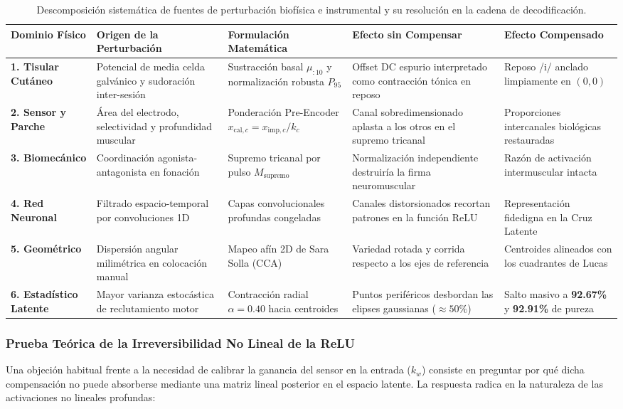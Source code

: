 \documentclass[11pt,a4paper,openany]{book}
\theoremstyle{definition}
\begin{document}
\begin{table}[H]
\centering
\small
\begin{tabularx}{\textwidth}{p{2.2cm}p{3.2cm}p{3.0cm}p{3.8cm}p{2.6cm}}
\toprule
\textbf{Dominio Físico} & \textbf{Origen de la Perturbación} & \textbf{Formulación Matemática} & \textbf{Efecto sin Compensar} & \textbf{Efecto Compensado} \\
\midrule
\textbf{1. Tisular Cutáneo} & Potencial de media celda galvánico y sudoración inter-sesión & Sustracción basal $\mu_{:10}$ y normalización robusta $P_{95}$ & Offset DC espurio interpretado como contracción tónica en reposo & Reposo /i/ anclado limpiamente en $(0,0)$ \\
\midrule
\textbf{2. Sensor y Parche} & Área del electrodo, selectividad y profundidad muscular & Ponderación Pre-Encoder $x_{\text{cal}, c} = x_{\text{imp}, c} / k_c$ & Canal sobredimensionado aplasta a los otros en el supremo tricanal & Proporciones intercanales biológicas restauradas \\
\midrule
\textbf{3. Biomecánico} & Coordinación agonista-antagonista en fonación & Supremo tricanal por pulso $M_{\text{supremo}}$ & Normalización independiente destruiría la firma neuromuscular & Razón de activación intermuscular intacta \\
\midrule
\textbf{4. Red Neuronal} & Filtrado espacio-temporal por convoluciones 1D & Capas convolucionales profundas congeladas & Canales distorsionados recortan patrones en la función $\text{ReLU}$ & Representación fidedigna en la Cruz Latente \\
\midrule
\textbf{5. Geométrico} & Dispersión angular milimétrica en colocación manual & Mapeo afín 2D de Sara Solla (CCA) & Variedad rotada y corrida respecto a los ejes de referencia & Centroides alineados con los cuadrantes de Lucas \\
\midrule
\textbf{6. Estadístico Latente} & Mayor varianza estocástica de reclutamiento motor & Contracción radial $\alpha = 0.40$ hacia centroides & Puntos periféricos desbordan las elipses gaussianas ($\approx 50\%$) & Salto masivo a \textbf{92.67\%} y \textbf{92.91\%} de pureza \\
\bottomrule
\end{tabularx}
\caption{Descomposición sistemática de fuentes de perturbación biofísica e instrumental y su resolución en la cadena de decodificación.}
\label{tab:descomposicion_biofisica_cadena}
\end{table}

\subsubsection{Prueba Teórica de la Irreversibilidad No Lineal de la ReLU}
Una objeción habitual frente a la necesidad de calibrar la ganancia del sensor en la entrada ($k_w$) consiste en preguntar por qué dicha compensación no puede absorberse mediante una matriz lineal posterior en el espacio latente. La respuesta radica en la naturaleza de las activaciones no lineales profundas:
\end{document}
